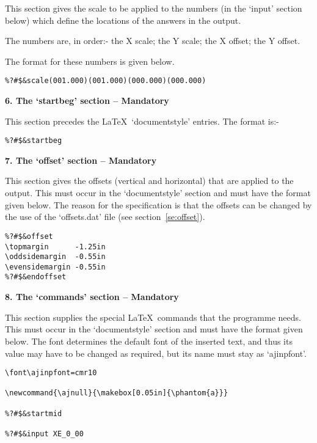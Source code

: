 This section gives the scale to be applied to the numbers (in the `input'
section below) which define the locations of the answers in the output.

The numbers are, in order:- the X scale; the Y scale; the X offset; the Y
offset. 

The format for these numbers is given below. 

\begin{verbatim}
%?#$&scale(001.000)(001.000)(000.000)(000.000)
\end{verbatim}

\vspace*{0.2cm}
{\bf \large 6. The `startbeg' section -- Mandatory}
\vspace*{0.2cm}

This section precedes the \LaTeX\ `documentstyle' entries. The format is:- 

\begin{verbatim}
%?#$&startbeg
\end{verbatim}

\vspace*{0.2cm}
{\bf \large 7. The `offset' section -- Mandatory}
\vspace*{0.2cm}

This section gives the offsets (vertical and horizontal) that are applied
to the output. This must occur in the `documentstyle' section and must have
the format given below. The reason for the specification is that the
offsets can be changed by the use of the `offsets.dat' file (see
section~\ref{se:offset}). 

\begin{verbatim}
%?#$&offset
\topmargin      -1.25in
\oddsidemargin  -0.55in
\evensidemargin -0.55in
%?#$&endoffset
\end{verbatim}

\vspace*{0.2cm}
{\bf \large 8. The `commands' section -- Mandatory}
\vspace*{0.2cm}

This section supplies the special \LaTeX\ commands that the programme
needs. This must occur in the `documentstyle' section and must have the
format given below. The font determines the default font of the inserted
text, and thus its value may have to be changed as required, but its name
must stay as `ajinpfont'. 

\begin{verbatim}
\font\ajinpfont=cmr10

\newcommand{\ajnull}{\makebox[0.05in]{\phantom{a}}}

%?#$&startmid

%?#$&input XE_0_00
\end{verbatim}


